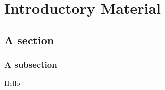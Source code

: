 

\chapter{Introductory Material}
\label{chapterlabel1}


\section{A section}
\blindmathpaper
\subsection{A subsection}
Hello